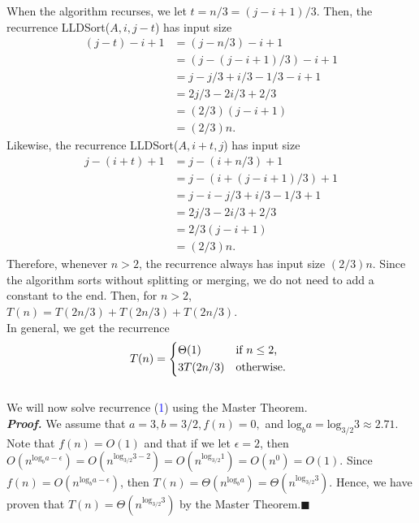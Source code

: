 \documentclass{article}
\begin{document}
When the algorithm recurses, we let $t = n/3 = (j - i + 1)/3$. Then, the recurrence LLDSort($A, i, j-t$) has input size
\begin{align*}
(j - t) - i + 1 &= (j - n/3) - i + 1 \\
&= (j - (j - i + 1)/3) - i + 1\\
&= j - j/3 + i/3 - 1/3 - i + 1\\
&= 2j/3 - 2i/3 + 2/3\\
&= (2/3)(j - i + 1)\\
&= (2/3)n.
\end{align*}
Likewise, the recurrence LLDSort($A,i+t,j$) has input size
\begin{align*}
j - (i + t) + 1 &= j - (i + n/3) + 1\\
&= j - (i + (j - i + 1)/3) + 1\\
&= j - i - j/3 + i/3 -1/3 + 1\\
&= 2j/3 -2i/3 + 2/3\\
&= 2/3(j - i + 1)\\
&= (2/3)n.
\end{align*}
Therefore, whenever $n > 2$, the recurrence always has input size $(2/3)n$. Since the algorithm sorts without splitting or merging, we do not need to add a constant to the end. Then, for $n > 2$, $T(n) = T(2n/3) + T(2n/3) + T(2n/3)$.\\

In general, we get the recurrence
\begin{equation}
T(n) =
\begin{dcases*}
\Theta(1) & if $n \leq 2$,\\
3T(2n/3) & otherwise.
\end{dcases*}
\end{equation}
\\We will now solve recurrence (\textcolor{blue}{1}) using the Master Theorem.\\
\textit{\textbf{Proof.}} We assume that $a = 3, b = 3/2, f(n) = 0,$ and $\text{log}_b a = \text{log}_{3/2} 3 \approx 2.71$. Note that $f(n) = O(1)$ and that if we let $\epsilon = 2$, then $O(n^{\text{log}_b a - \epsilon}) = O(n^{\text{log}_{3/2} 3 - 2}) = O(n^{\text{log}_{3/2} 1}) = O(n^0) = O(1).$ Since $f(n) = O(n^{\text{log}_b a - \epsilon})$, then $T(n) = \Theta(n^{\text{log}_b a}) = \Theta(n^{\text{log}_{3/2} 3}).$ Hence, we have proven that $T(n) = \Theta(n^{\text{log}_{3/2} 3})$ by the Master Theorem.\hfill$\blacksquare$
\end{document}
